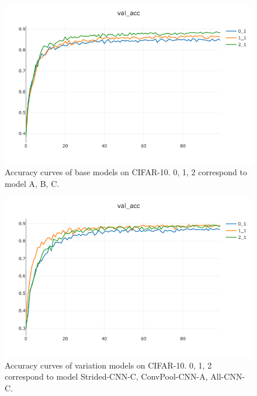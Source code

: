 \documentclass[10pt,twocolumn,letterpaper]{article}
\begin{document}
        \begin{figure}
            \centering            
            \includegraphics[width=\linewidth]{seolen_fig/BaseNet_VA.png}
            \caption{Accuracy curves of base models on CIFAR-10. 0, 1, 2 correspond to model A, B, C.}
            \label{fig:a}
        \end{figure}

        \begin{figure}
            \centering            
            \includegraphics[width=\linewidth]{seolen_fig/VNET_3_VA.png}
            \caption{Accuracy curves of variation models on CIFAR-10. 0, 1, 2 correspond to model Strided-CNN-C, ConvPool-CNN-A, All-CNN-C.}
            \label{fig:b}
        \end{figure}
\end{document}
